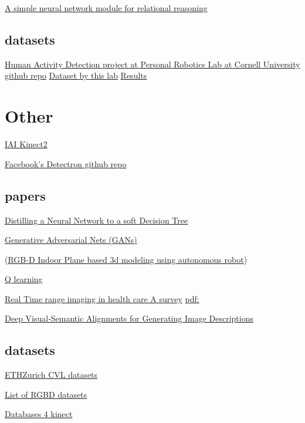 \href{https://arxiv.org/abs/1706.01427}{A simple neural network module for relational reasoning}

\subsection{datasets}

\href{https://github.com/jysung/activity_detection}{Human Activity Detection project at Personal Robotics Lab at Cornell University github repo}
\href{http://pr.cs.cornell.edu/humanactivities/data.php#format}{Dataset by this lab}
\href{http://pr.cs.cornell.edu/humanactivities/results.php}{Results}


\section{Other}
\href{https://github.com/code-iai/iai_kinect2}{IAI Kinect2}

\href{https://github.com/facebookresearch/Detectron}{Facebook's Detectron github repo}

\subsection{papers}
\href{https://arxiv.org/pdf/1711.09784.pdf}{Distilling a Neural Network to a soft Decision Tree}

\href{https://arxiv.org/pdf/1406.2661.pdf}{Generative Adversarial Nets (GANs)}

(\href{https://www.int-arch-photogramm-remote-sens-spatial-inf-sci.net/XL-1/301/2014/isprsarchives-XL-1-301-2014.pdf}{RGB-D Indoor Plane based 3d modeling using autonomous robot})

\href{https://arxiv.org/pdf/1707.03770.pdf}{Q learning}

\href{https://mdanderson.influuent.utsystem.edu/en/publications/real-time-range-imaging-in-health-care-a-survey}{Real Time range imaging in health care A survey}
\href{https://link.springer.com/content/pdf/10.1007\%2F978-3-642-44964-2_11.pdf}{pdf:}

\href{https://cs.stanford.edu/people/karpathy/cvpr2015.pdf}{Deep Visual-Semantic Alignments for Generating Image Descriptions}

\subsection{datasets}

\href{http://www.vision.ee.ethz.ch/en/datasets/}{ETHZurich CVL datasets}

\href{http://www.michaelfirman.co.uk/RGBDdatasets/}{List of RGBD datasets}

\href{http://www.tlc.dii.univpm.it/blog/databases4kinect}{Databases 4 kinect}
